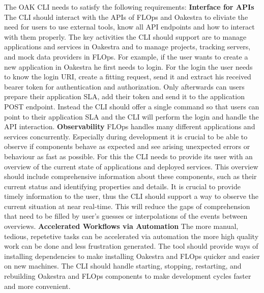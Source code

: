 The OAK CLI needs to satisfy the following requirements:
\vspace{5mm}
\newline
\textbf{Interface for APIs}\newline
The CLI should interact with the APIs of FLOps and Oakestra to eliviate the need for users to use external tools, know all API endpoints and how to interact with them properly.
The key activities the CLI should support are to manage applications and services in Oakestra and to manage projects, tracking servers, and mock data providers in FLOps.
For example, if the user wants to create a new application in Oakestra he first needs to login.
For the login the user needs to know the login URI, create a fitting request, send it and extract his received bearer token for authentication and authorization.
Only afterwards can users prepare their application SLA, add their token and send it to the application POST endpoint.
Instead the CLI should offer a single command so that users can point to their application SLA and the CLI will perform the login and handle the API interaction.
\vspace{5mm}
\newline
\textbf{Observability}\newline
FLOps handles many different applications and services concurrently.
Especially during development it is crucial to be able to observe if components behave as expected and see arising unexpected errors or behaviour as fast as possible.
For this the CLI needs to provide its user with an overview of the current state of applications and deployed services.
This overview should include comprehensive information about these components, such as their current status and identifying properties and details.
It is crucial to provide timely information to the user, thus the CLI should support a way to observe the current situation at near real-time.
This will reduce the gaps of comprehension that need to be filled by user's guesses or interpolations of the events between overviews.
\vspace{5mm}
\newline
\textbf{Accelerated Workflows via Automation}\newline
The more manual, tedious,  repetetive tasks can be accelerated via automation the more high quality work can be done and less frustration generated.
The tool should provide ways of installing dependencies to make installing Oakestra and FLOps quicker and easier on new machines.
The CLI should handle starting, stopping, restarting, and rebuilding Oakestra and FLOps components to make development cycles faster and more convenient.
